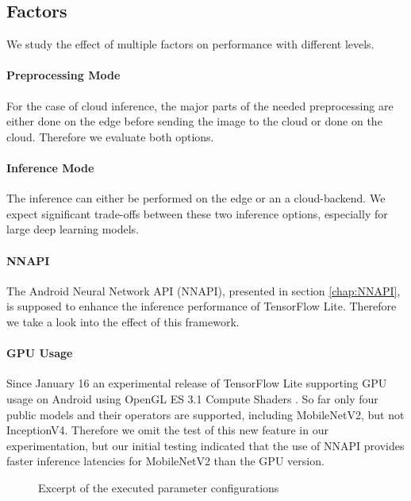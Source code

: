 \subsection{Factors}
We study the effect of multiple factors on performance with different levels.

\paragraph{Preprocessing Mode}
For the case of cloud inference, the major parts of the needed preprocessing are either done on the edge before sending the image to the cloud or done on the cloud. Therefore we evaluate both options.
\paragraph{Inference Mode}
The inference can either be performed on the edge or an a cloud-backend.
We expect significant trade-offs between these two inference options, especially for large deep learning models.


\paragraph{NNAPI}
The Android Neural Network API (NNAPI), presented in section \ref{chap:NNAPI}, is supposed to enhance the inference performance of TensorFlow Lite. Therefore we take a look into the effect of this framework.
\paragraph{GPU Usage}
Since January 16 an experimental release of TensorFlow Lite supporting GPU usage on Android using OpenGL ES 3.1 Compute Shaders \cite{tfLiteGPU}.
So far only four public models and their operators are supported, including MobileNetV2, but not InceptionV4. 
Therefore we omit the test of this new feature in our experimentation, but our initial testing indicated that the use of NNAPI provides faster inference latencies for MobileNetV2 than the GPU version.


\begin{figure}[!htb]
\centering
 \scalebox{.7}{}

\caption{Excerpt of the executed parameter configurations}
\label{fig:tree}
\end{figure}


